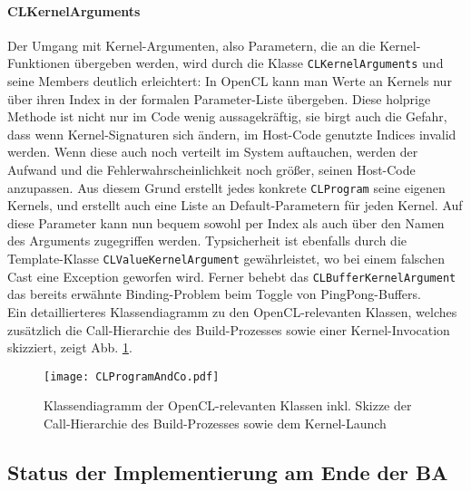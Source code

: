 		\paragraph{CLKernelArguments}
		\label{sec:CLKernelArguments}
		Der Umgang mit Kernel-Argumenten, also Parametern, die an die Kernel-Funktionen übergeben werden, 
		wird durch die Klasse \lstinline|CLKernelArguments| und seine Members deutlich erleichtert:
		In OpenCL kann man Werte an Kernels nur über ihren Index in der formalen Parameter-Liste übergeben.
		Diese holprige Methode ist nicht nur im Code wenig aussagekräftig, sie birgt auch die Gefahr,
		dass wenn Kernel-Signaturen sich ändern, im Host-Code genutzte Indices invalid werden.
		Wenn diese auch noch verteilt im System auftauchen, werden der Aufwand und die 
		Fehlerwahrscheinlichkeit noch größer, seinen Host-Code anzupassen. 
		Aus diesem Grund erstellt jedes konkrete \lstinline|CLProgram| seine eigenen Kernels,
		und erstellt auch eine Liste an Default-Parametern für jeden Kernel. Auf diese Parameter kann nun bequem
		sowohl per Index als auch über den Namen des Arguments zugegriffen werden. Typsicherheit ist ebenfalls
		durch die Template-Klasse \lstinline|CLValueKernelArgument| gewährleistet, wo bei einem falschen
		Cast eine Exception geworfen wird.
		Ferner behebt das \lstinline|CLBufferKernelArgument| das bereits erwähnte Binding-Problem 
		beim Toggle von PingPong-Buffers.\\
		Ein detaillierteres Klassendiagramm zu den OpenCL-relevanten Klassen,
		welches zusätzlich die Call-Hierarchie des Build-Prozesses sowie einer Kernel-Invocation skizziert,
		zeigt Abb. \ref{fig:OCLRelatedClassDiag}.
		
		\begin{figure}[t]
		\texttt{[image: CLProgramAndCo.pdf]}
		\caption{Klassendiagramm der OpenCL-relevanten Klassen inkl. Skizze der Call-Hierarchie des Build-Prozesses
		sowie dem Kernel-Launch}
		\label{fig:OCLRelatedClassDiag}
		\end{figure}



\subsection{Status der Implementierung am Ende der BA}
\label{sec:statusImplementation}

